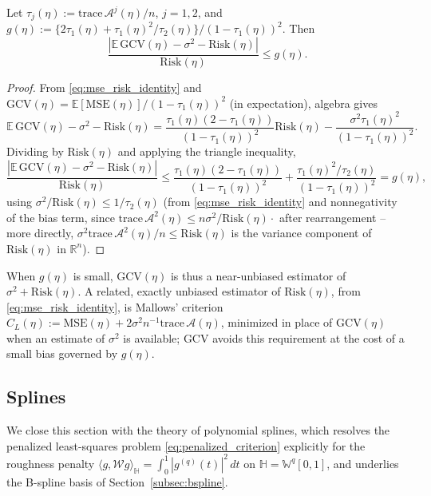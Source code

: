 \begin{theorem}
\label{thm:gcv}
Let $\tau_j(\eta):=\mathrm{trace}\,\mathcal{A}^j(\eta)/n$, $j=1,2$, and
$g(\eta):=\{2\tau_1(\eta)+\tau_1(\eta)^2/\tau_2(\eta)\}/(1-\tau_1(\eta))^2$.
Then
\begin{equation}
\frac{|\mathbb{E}\,\mathrm{GCV}(\eta)-\sigma^2-\mathrm{Risk}(\eta)|}{
\mathrm{Risk}(\eta)} \leq g(\eta).
\label{eq:gcv_theorem}
\end{equation}
\end{theorem}

\begin{proof}
From \eqref{eq:mse_risk_identity} and $\mathrm{GCV}(\eta)=\mathbb{E}[
\mathrm{MSE}(\eta)]/(1-\tau_1(\eta))^2$ (in expectation), algebra gives
\[
\mathbb{E}\,\mathrm{GCV}(\eta)-\sigma^2-\mathrm{Risk}(\eta) =
\frac{\tau_1(\eta)(2-\tau_1(\eta))}{(1-\tau_1(\eta))^2}\mathrm{Risk}(\eta)
- \frac{\sigma^2\tau_1(\eta)^2}{(1-\tau_1(\eta))^2}.
\]
Dividing by $\mathrm{Risk}(\eta)$ and applying the triangle inequality,
\[
\frac{|\mathbb{E}\,\mathrm{GCV}(\eta)-\sigma^2-\mathrm{Risk}(\eta)|}{
\mathrm{Risk}(\eta)} \leq \frac{\tau_1(\eta)(2-\tau_1(\eta))}{(1-\tau_1
(\eta))^2} + \frac{\tau_1(\eta)^2/\tau_2(\eta)}{(1-\tau_1(\eta))^2} =
g(\eta),
\]
using $\sigma^2/\mathrm{Risk}(\eta)\leq 1/\tau_2(\eta)$ (from
\eqref{eq:mse_risk_identity} and nonnegativity of the bias term, since
$\mathrm{trace}\,\mathcal{A}^2(\eta) \le n\sigma^2/\mathrm{Risk}(\eta)\cdot$
after rearrangement -- more directly, $\sigma^2\mathrm{trace}\,
\mathcal{A}^2(\eta)/n \leq \mathrm{Risk}(\eta)$ is the variance component of
$\mathrm{Risk}(\eta)$ in $\mathbb{R}^n$).
\end{proof}

When $g(\eta)$ is small, $\mathrm{GCV}(\eta)$ is thus a near-unbiased
estimator of $\sigma^2+\mathrm{Risk}(\eta)$. A related, exactly unbiased
estimator of $\mathrm{Risk}(\eta)$, from \eqref{eq:mse_risk_identity}, is
Mallows' criterion $C_L(\eta):=\mathrm{MSE}(\eta)+2\sigma^2n^{-1}
\mathrm{trace}\,\mathcal{A}(\eta)$, minimized in place of
$\mathrm{GCV}(\eta)$ when an estimate of $\sigma^2$ is available; GCV
avoids this requirement at the cost of a small bias governed by $g(\eta)$.

\subsection{Splines}
\label{subsec:splines_theory}

We close this section with the theory of polynomial splines, which
resolves the penalized least-squares problem
\eqref{eq:penalized_criterion} explicitly for the roughness penalty
$\langle g,\mathcal{W}g\rangle_{\mathbb{H}}=\int_0^1|g^{(q)}(t)|^2\,dt$ on
$\mathbb{H}=\mathbb{W}^q[0,1]$, and underlies the B-spline basis of
Section~\ref{subsec:bspline}.

